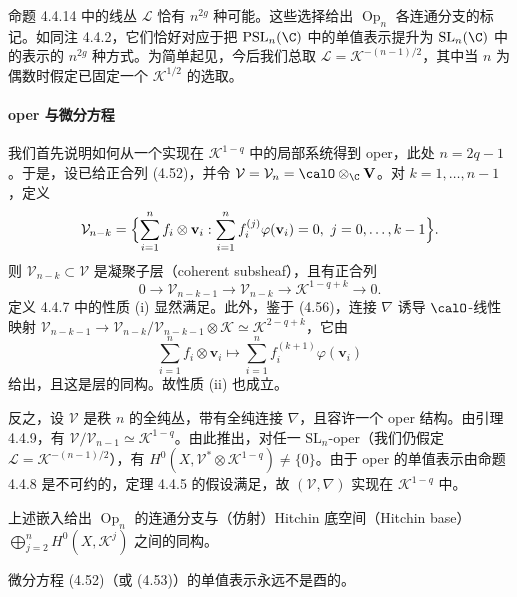 \begin{remark}
命题 4.4.14 中的线丛 $\mathcal{L}$ 恰有 $n^{2g}$ 种可能。这些选择给出 $\operatorname{Op}_n$ 各连通分支的标记。如同注 4.4.2，它们恰好对应于把 $\mathrm{PSL}_n(\C)$ 中的单值表示提升为 $\mathrm{SL}_n(\C)$ 中的表示的 $n^{2g}$ 种方式。为简单起见，今后我们总取 $\mathcal{L}=\mathcal{K}^{-(n-1)/2}$，其中当 $n$ 为偶数时假定已固定一个 $\mathcal{K}^{1/2}$ 的选取。
\end{remark}

\paragraph{oper 与微分方程}

我们首先说明如何从一个实现在 $\mathcal{K}^{1-q}$ 中的局部系统得到 oper，此处 $n=2q-1$。于是，设已给正合列 (4.52)，并令 $\mathcal{V}=\mathcal{V}_n=\calO\otimes_\C\mathbf{V}$。对 $k=1,\dots,n-1$，定义
\[
\mathcal{V}_{n-k}=\Bigl\{\sum_{i=1}^n f_i\otimes\mathbf{v}_i:\sum_{i=1}^n f_i^{(j)}\varphi(\mathbf{v}_i)=0,\ j=0,\dots,k-1\Bigr\}.
\]
则 $\mathcal{V}_{n-k}\subset\mathcal{V}$ 是凝聚子层（coherent subsheaf），且有正合列
\begin{equation}
0\to\mathcal{V}_{n-k-1}\to\mathcal{V}_{n-k}\to\mathcal{K}^{1-q+k}\to0.
\tag{4.56}
\end{equation}
定义 4.4.7 中的性质 (i) 显然满足。此外，鉴于 (4.56)，连接 $\nabla$ 诱导 $\calO$-线性映射 $\mathcal{V}_{n-k-1}\to\mathcal{V}_{n-k}/\mathcal{V}_{n-k-1}\otimes\mathcal{K}\simeq\mathcal{K}^{2-q+k}$，它由
\[
\sum_{i=1}^n f_i\otimes\mathbf{v}_i\mapsto\sum_{i=1}^n f_i^{(k+1)}\varphi(\mathbf{v}_i)
\]
给出，且这是层的同构。故性质 (ii) 也成立。

反之，设 $\mathcal{V}$ 是秩 $n$ 的全纯丛，带有全纯连接 $\nabla$，且容许一个 oper 结构。由引理 4.4.9，有 $\mathcal{V}/\mathcal{V}_{n-1}\simeq\mathcal{K}^{1-q}$。由此推出，对任一 $\mathrm{SL}_n$-oper（我们仍假定 $\mathcal{L}=\mathcal{K}^{-(n-1)/2}$），有 $H^0(X,\mathcal{V}^*\otimes\mathcal{K}^{1-q})\ne\{0\}$。由于 oper 的单值表示由命题 4.4.8 是不可约的，定理 4.4.5 的假设满足，故 $(\mathcal{V},\nabla)$ 实现在 $\mathcal{K}^{1-q}$ 中。

\begin{theorem}
上述嵌入给出 $\operatorname{Op}_n$ 的连通分支与（仿射）Hitchin 底空间（Hitchin base）$\bigoplus_{j=2}^n H^0(X,\mathcal{K}^j)$ 之间的同构。
\end{theorem}

\begin{corollary}[{Teleman, [63]}]
微分方程 (4.52)（或 (4.53)）的单值表示永远不是酉的。
\end{corollary}

